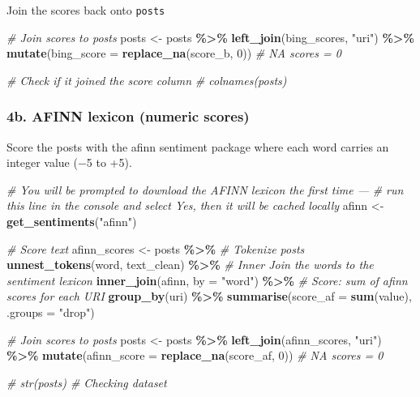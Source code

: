 \documentclass[
]{article}
\newenvironment{Shaded}{\begin{snugshade}}{\end{snugshade}}
\newcommand{\AttributeTok}[1]{\textcolor[rgb]{0.13,0.29,0.53}{#1}}
\newcommand{\CommentTok}[1]{\textcolor[rgb]{0.56,0.35,0.01}{\textit{#1}}}
\newcommand{\DecValTok}[1]{\textcolor[rgb]{0.00,0.00,0.81}{#1}}
\newcommand{\FunctionTok}[1]{\textcolor[rgb]{0.13,0.29,0.53}{\textbf{#1}}}
\newcommand{\NormalTok}[1]{#1}
\newcommand{\OtherTok}[1]{\textcolor[rgb]{0.56,0.35,0.01}{#1}}
\newcommand{\SpecialCharTok}[1]{\textcolor[rgb]{0.81,0.36,0.00}{\textbf{#1}}}
\newcommand{\StringTok}[1]{\textcolor[rgb]{0.31,0.60,0.02}{#1}}
\begin{document}
Join the scores back onto \texttt{posts}

\begin{Shaded}
\begin{Highlighting}[]
\CommentTok{\# Join scores to posts  }
\NormalTok{posts }\OtherTok{\textless{}{-}}\NormalTok{ posts }\SpecialCharTok{\%\textgreater{}\%}
  \FunctionTok{left\_join}\NormalTok{(bing\_scores, }\StringTok{"uri"}\NormalTok{) }\SpecialCharTok{\%\textgreater{}\%} 
  \FunctionTok{mutate}\NormalTok{(}\AttributeTok{bing\_score =} \FunctionTok{replace\_na}\NormalTok{(score\_b, }\DecValTok{0}\NormalTok{)) }\CommentTok{\# NA scores = 0 }

\CommentTok{\# Check if it joined the score column }
\CommentTok{\# colnames(posts)}
\end{Highlighting}
\end{Shaded}

\subsubsection{4b. AFINN lexicon (numeric
scores)}\label{b.-afinn-lexicon-numeric-scores}

Score the posts with the afinn sentiment package where each word carries
an integer value (−5 to +5).

\begin{Shaded}
\begin{Highlighting}[]
\CommentTok{\# You will be prompted to download the AFINN lexicon the first time —}
\CommentTok{\# run this line in the console and select Yes, then it will be cached locally}
\NormalTok{afinn }\OtherTok{\textless{}{-}} \FunctionTok{get\_sentiments}\NormalTok{(}\StringTok{"afinn"}\NormalTok{)}

\CommentTok{\# Score text}
\NormalTok{afinn\_scores }\OtherTok{\textless{}{-}}\NormalTok{ posts }\SpecialCharTok{\%\textgreater{}\%}
  \CommentTok{\# Tokenize posts }
  \FunctionTok{unnest\_tokens}\NormalTok{(word, text\_clean) }\SpecialCharTok{\%\textgreater{}\%} 
  \CommentTok{\# Inner Join the words to the sentiment lexicon  }
  \FunctionTok{inner\_join}\NormalTok{(afinn, }\AttributeTok{by =} \StringTok{"word"}\NormalTok{) }\SpecialCharTok{\%\textgreater{}\%} 
  \CommentTok{\# Score: sum of afinn scores for each URI }
  \FunctionTok{group\_by}\NormalTok{(uri) }\SpecialCharTok{\%\textgreater{}\%} 
  \FunctionTok{summarise}\NormalTok{(}\AttributeTok{score\_af =} \FunctionTok{sum}\NormalTok{(value), }\AttributeTok{.groups =} \StringTok{"drop"}\NormalTok{)}


\CommentTok{\# Join scores to posts  }
\NormalTok{posts }\OtherTok{\textless{}{-}}\NormalTok{ posts }\SpecialCharTok{\%\textgreater{}\%} 
  \FunctionTok{left\_join}\NormalTok{(afinn\_scores, }\StringTok{"uri"}\NormalTok{) }\SpecialCharTok{\%\textgreater{}\%} 
  \FunctionTok{mutate}\NormalTok{(}\AttributeTok{afinn\_score =} \FunctionTok{replace\_na}\NormalTok{(score\_af, }\DecValTok{0}\NormalTok{)) }\CommentTok{\# NA scores = 0 }

\CommentTok{\# str(posts) \# Checking dataset }
\end{Highlighting}
\end{Shaded}
\end{document}

